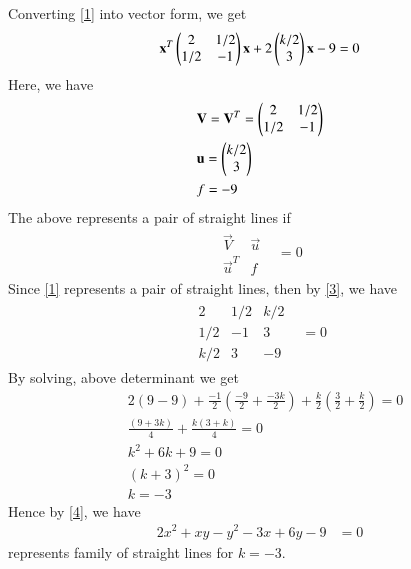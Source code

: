 \documentclass[journal,12pt,twocolumn]{IEEEtran}
\begin{document}
Converting \eqref{1} into vector form, we get
\begin{align}
	\mathbf{x}^T\begin{pmatrix}2 & 1/2 \\ 1/2 & -1\end{pmatrix}\mathbf{x}+2\begin{pmatrix}k/2 \\ 3\end{pmatrix}\mathbf{x}-9=0 \label{2}
\end{align} 
Here, we have
\begin{align}
& \mathbf{V} = \mathbf{V}^T = \begin{pmatrix}2 & 1/2 \\ 1/2 & -1\end{pmatrix} \\
& \mathbf{u} = \begin{pmatrix}k/2 \\ 3\end{pmatrix} \\
& f = -9
\end{align}
The above represents a pair of straight lines if
\begin{align}
	\begin{array}{|cc|}
		\vec{V} & \vec{u}\\\vec{u}^T & f
	\end{array}&=0\label{3}
\end{align}
Since \eqref{1} represents a pair of straight lines, then by \eqref{3}, we have
\begin{align}
	\begin{array}{|ccc|}
		2 & 1/2 & k/2 \\ 1/2 & -1 & 3  \\ k/2 & 3 & -9 
	\end{array}&=0
\end{align}
By solving, above determinant we get
\begin{align}
& 2(9-9) + \frac{-1}{2}(\frac{-9}{2} + \frac{-3k}{2}) + \frac{k}{2}(\frac{3}{2} + \frac{k}{2})  = 0\\
& \frac{(9+3k)}{4} + \frac{k(3+k)}{4}  = 0 \\
& k^2 + 6k + 9 =0 \\
& (k+3)^2 = 0 \\
& k = -3 \label{4}
\end{align}
Hence by \eqref{4}, we have
\begin{align}
   2x^2+ xy -y^2 - 3x + 6y - 9 &= 0
\end{align} 
represents family of straight lines for $k=-3$.
\end{document}
